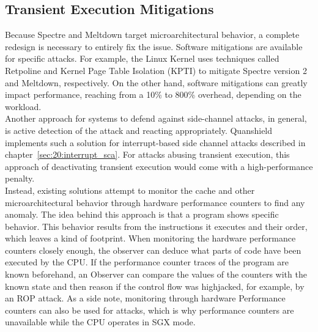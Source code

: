 \subsection{Transient Execution Mitigations}
\label{sec:20:def_sca}
Because Spectre and Meltdown target microarchitectural behavior, a complete
redesign is necessary to entirely fix the issue. Software mitigations are
available for specific attacks. For example, the Linux Kernel uses techniques
called Retpoline and Kernel Page Table Isolation (KPTI) to mitigate Spectre
version 2 and Meltdown, respectively.\cite{retpoline} On the other hand, software mitigations
can greatly impact performance, reaching from a 10\% to 800\% overhead,
depending on the workload.\cite{low2018overview}\\

Another approach for systems to defend against side-channel attacks, in general,
is active detection of the attack and reacting appropriately. Quanshield
implements such a solution for interrupt-based side channel attacks described in
chapter~\ref{sec:20:interrupt_sca}. For attacks abusing transient execution,
this approach of deactivating transient execution would come with a
high-performance penalty.\\

Instead, existing solutions attempt to monitor the
cache and other microarchitectural behavior through hardware performance
counters to find any anomaly. The idea behind this approach is that a program
shows specific behavior. This behavior results from the instructions it executes
and their order, which leaves a kind of footprint. When monitoring the hardware
performance counters closely enough, the observer can deduce what parts of code
have been executed by the CPU. If the performance counter traces of the program
are known beforehand, an Observer can compare the values of the counters with
the known state and then reason if the control flow was highjacked, for example,
by an ROP attack. As a side note, monitoring through hardware Performance
counters can also be used for attacks, which is why performance counters are
unavailable while the CPU operates in SGX mode.
\cite{uhsadel2008exploiting,costan2016intel}

